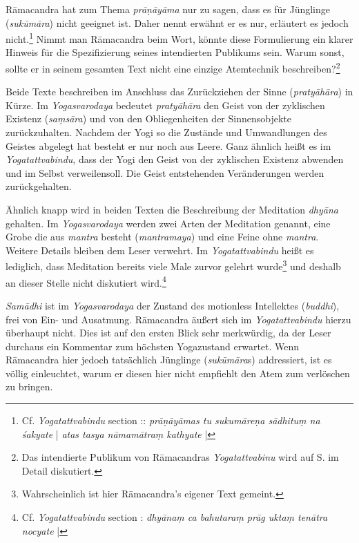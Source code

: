 Rāmacandra hat zum Thema \textit{prāṇāyāma} nur zu sagen, dass es für Jünglinge (\textit{sukūmāra}) nicht geeignet ist. Daher nennt erwähnt er es nur, erläutert es jedoch nicht.\footnote{Cf. \textit{Yogatattvabindu} section :: \textit{prāṇāyāmas tu sukumāreṇa sādhituṃ na śakyate} | \textit{atas tasya nāmamātraṃ kathyate} |} Nimmt man Rāmacandra beim Wort, könnte diese Formulierung ein klarer Hinweis für die Spezifizierung seines intendierten Publikums sein. Warum sonst, sollte er in seinem gesamten Text nicht eine einzige Atemtechnik beschreiben?\footnote{Das intendierte Publikum von Rāmacandras \textit{Yogatattvabinu} wird auf S.\pageref{ytbaudience} im Detail diskutiert.}

Beide Texte beschreiben im Anschluss das Zurückziehen der Sinne (\textit{pratyāhāra}) in Kürze. Im \textit{Yogasvarodaya} bedeutet \textit{pratyāhāra} den Geist von der zyklischen Existenz (\textit{saṃsāra}) und von den Obliegenheiten der Sinnensobjekte zurückzuhalten. Nachdem der Yogi so die Zustände und Umwandlungen des Geistes abgelegt hat besteht er nur noch aus Leere. Ganz ähnlich heißt es im \textit{Yogatattvabindu}, dass der Yogi den Geist von der zyklischen Existenz abwenden und im Selbst verweilensoll. Die Geist entstehenden Veränderungen werden zurückgehalten.

Ähnlich knapp wird in beiden Texten die Beschreibung der Meditation \textit{dhyāna} gehalten. Im \textit{Yogasvarodaya} werden zwei Arten der Meditation genannt, eine Grobe die aus \textit{mantra} besteht (\textit{mantramaya}) und eine Feine ohne \textit{mantra}. Weitere Details bleiben dem Leser verwehrt. Im \textit{Yogatattvabindu} heißt es lediglich, dass Meditation bereits viele Male zurvor gelehrt wurde\footnote{Wahrscheinlich ist hier Rāmacandra's eigener Text gemeint.} und deshalb an dieser Stelle nicht diskutiert wird.\footnote{Cf. \textit{Yogatattvabindu} section : \textit{dhyānaṃ ca bahutaraṃ prāg uktaṃ tenātra nocyate} |}

\textit{Samādhi} ist im \textit{Yogasvarodaya} der Zustand des motionless Intellektes (\textit{buddhi}), frei von Ein- und Ausatmung. Rāmacandra äußert sich im \textit{Yogatattvabindu} hierzu überhaupt nicht. Dies ist auf den ersten Blick sehr merkwürdig, da der Leser durchaus ein Kommentar zum höchsten Yogazustand erwartet. Wenn Rāmacandra hier jedoch tatsächlich Jünglinge (\textit{sukūmāra}s) addressiert, ist es völlig einleuchtet, warum er diesen hier nicht empfiehlt den Atem zum verlöschen zu bringen.  

